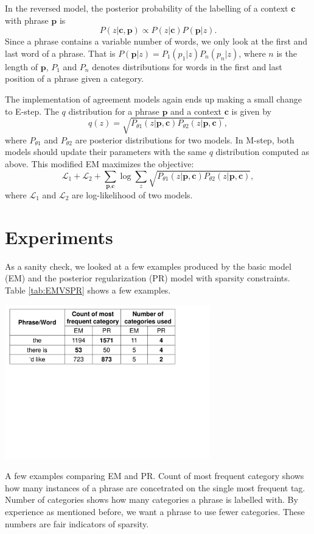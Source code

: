 In the reversed model,
the posterior probability of the labelling of
a context $\textbf{c}$ with
phrase $\textbf{p}$ is 
\[
P(z|\textbf{c},\textbf{p})\propto 
P(z|\textbf{c})P(\textbf{p}|z).
\]
Since a phrase contains a variable number of words,
we only look at the first and last word of
a phrase. That is $P(\textbf{p}|z)=P_1(p_1|z)P_n(p_n|z)$,
where $n$ is the length of $\textbf{p}$, $P_1$ and $P_n$
denotes distributions for words in the first and last position
of a phrase given a category.

The implementation of agreement models again ends up making
a small change to E-step. The $q$ distribution for
a phrase $\textbf{p}$ and a context $\textbf{c}$ 
is given by
\[
q(z)=\sqrt{P_{\theta 1}
(z|\textbf{p},\textbf{c})P_{\theta 2}(z|\textbf{p},\textbf{c})},
\]
where $P_{\theta 1}$ and $P_{\theta 2}$ are
posterior distributions for two models.
In M-step, both models should update their parameters with the
same $q$ distribution computed as above.
This modified EM maximizes the objective:
\[
\mathcal{L}_1+
\mathcal{L}_2+
\sum_{\textbf{p},\textbf{c}}
\log\sum_z\sqrt{P_{\theta 1}(z|\textbf{p},\textbf{c})
P_{\theta 2}(z|\textbf{p},\textbf{c})},
\]
where $\mathcal{L}_1$ and $\mathcal{L}_2$
are log-likelihood of
two models.
\section{Experiments}
As a sanity check, we looked at a few examples produced by
the basic model (EM) 
and the posterior regularization (PR) model
with sparsity constraints. Table \ref{tab:EMVSPR}
shows a few examples.

\begin{table}[h]
  \centering
  \includegraphics[width=3.5in]{pr-clustering/EMVSPR}
  \caption[A few examples comparing EM and PR]
  {A few examples comparing EM and PR. 
    Count of most frequent category shows how 
    many instances of a phrase are concetrated on 
    the single most frequent tag. 
    Number of categories shows how many categories
    a phrase is labelled with. By experience as mentioned before, 
    we want a phrase to use fewer categories. 
	These numbers are fair indicators of sparsity.
    }
  \label{tab:EMVSPR}
\end{table}

